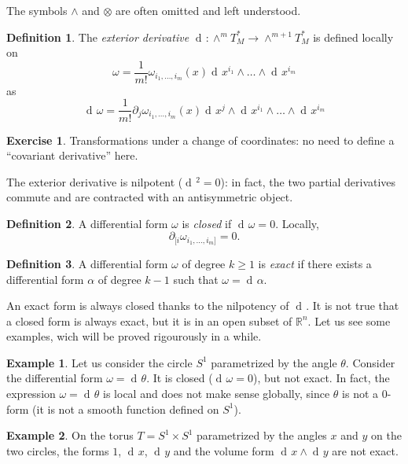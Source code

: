 \documentclass[a4paper,12pt]{book}
\newcommand{\dd}{\mathop{\mathrm{d}\!}{}}
\theoremstyle{definition}
\newtheorem{definition}{Definition}
\newtheorem{example}{Example}
\newtheorem{exercise}{Exercise}
\theoremstyle{remark}
\begin{document}
The symbols $\wedge$ and $\otimes$ are often omitted and left understood.

\begin{definition}
The \emph{exterior derivative} $\dd\colon\wedge^mT_M^*\to\wedge^{m+1}T_M^*$ is defined locally on
\[\omega=\frac{1}{m!}\omega_{i_1,\ldots,i_m}(x)\dd x^{i_1}\wedge\ldots\wedge\dd x^{i_m}\]
as
\[\dd\omega=\frac{1}{m!}\partial_j\omega_{i_1,\ldots,i_m}(x)\dd x^j\wedge\dd x^{i_1}\wedge\ldots\wedge\dd x^{i_m}\]
\end{definition}

\begin{exercise}
Transformations under a change of coordinates: no need to define a ``covariant derivative'' here.
\end{exercise}

The exterior derivative is nilpotent ($\dd^2=0$): in fact, the two partial derivatives commute and are contracted with an antisymmetric object.

\begin{definition}
A differential form $\omega$ is \emph{closed} if $\dd\omega=0$. Locally,
\[\partial_{[i}\omega_{i_1,\ldots,i_m]}=0.\]
\end{definition}

\begin{definition}
A differential form $\omega$ of degree $k\ge 1$ is \emph{exact} if there exists a differential form $\alpha$ of degree $k-1$ such that $\omega=\dd\alpha$.
\end{definition}

An exact form is always closed thanks to the nilpotency of $\dd$. It is not true that a closed form is always exact, but it is in an open subset of $\mathbb R^n$. Let us see some examples, wich will be proved rigourously in a while.

\begin{example}
Let us consider the circle $S^1$ parametrized by the angle $\theta$. Consider the differential form $\omega=\dd\theta$. It is closed ($\dd\omega=0$), but not exact. In fact, the expression $\omega=\dd\theta$ is local and does not make sense globally, since $\theta$ is not a 0-form (it is not a smooth function defined on $S^1$).
\end{example}

\begin{example}
On the torus $T=S^1\times S^1$ parametrized by the angles $x$ and $y$ on the two circles, the forms $1$, $\dd x$, $\dd y$ and the volume form $\dd x\wedge \dd y$ are not exact.
\end{example}
\end{document}

